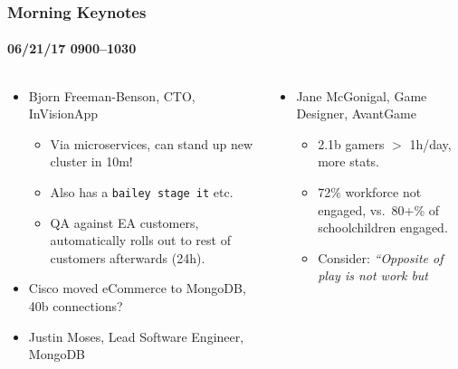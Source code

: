 \documentclass[xcolor=dvipsnames, 9pt]{beamer}
\begin{document}
\begin{frame}
    \frametitle{Morning Keynotes}
    \framesubtitle{06/21/17 0900--1030}

    \begin{columns}
        \begin{column}{0.5\textwidth}
            \begin{itemize}
                \item Bjorn Freeman-Benson, CTO, InVisionApp
                    \begin{itemize}
                        \item Via microservices, can stand up new cluster in 10m!
                        \item Also has a \texttt{bailey stage it} etc.
                        \item QA against EA customers, automatically rolls out to rest
                            of customers afterwards (24h).
                    \end{itemize}
                \item Cisco moved eCommerce to MongoDB, 40b connections?
                \item Justin Moses, Lead Software Engineer, MongoDB
            \end{itemize}
        \end{column}
        \begin{column}{0.5\textwidth}
            \begin{itemize}
                \item Jane McGonigal, Game Designer, AvantGame
                    \begin{itemize}
                        \item 2.1b gamers $>$ 1h/day, more stats.
                        \item 72\% workforce not engaged, vs.\ 80+\% of
                            schoolchildren engaged.
                        \item Consider: \emph{``Opposite of play is not work but
}
\end{itemize}
\end{itemize}
\end{column}
\end{columns}
\end{frame}
\end{document}
